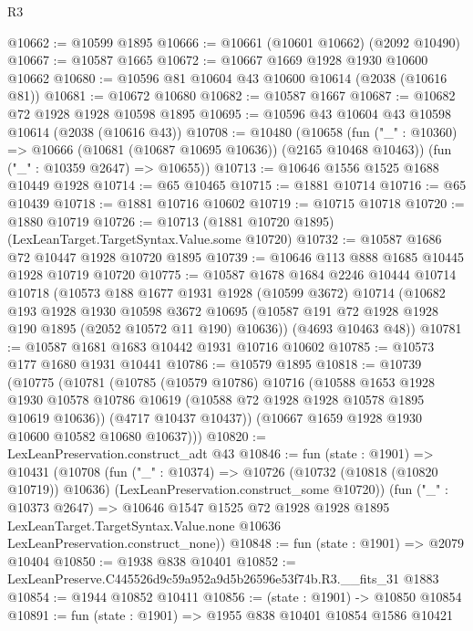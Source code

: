 \begin{lexlean}{R3}
\begin{coremodule}
@10662 := @10599 @1895
@10666 := @10661 (@10601 @10662) (@2092 @10490)
@10667 := @10587 @1665
@10672 := @10667 @1669 @1928 @1930 @10600 @10662
@10680 := @10596 @81 @10604 @43 @10600 @10614 (@2038 (@10616 @81))
@10681 := @10672 @10680
@10682 := @10587 @1667
@10687 := @10682 @72 @1928 @1928 @10598 @1895
@10695 := @10596 @43 @10604 @43 @10598 @10614 (@2038 (@10616 @43))
@10708 := @10480
    (@10658
      (fun ("_" : @10360) => @10666 (@10681 (@10687 @10695 @10636)) (@2165 @10468 @10463))
      (fun ("_" : @10359 @2647) => @10655))
@10713 := @10646 @1556 @1525 @1688 @10449 @1928
@10714 := @65 @10465
@10715 := @1881 @10714
@10716 := @65 @10439
@10718 := @1881 @10716 @10602
@10719 := @10715 @10718
@10720 := @1880 @10719
@10726 := @10713 (@1881 @10720 @1895) (LexLeanTarget.TargetSyntax.Value.some @10720)
@10732 := @10587 @1686 @72 @10447 @1928 @10720 @1895
@10739 := @10646 @113 @888 @1685 @10445 @1928 @10719 @10720
@10775 := @10587
    @1678
    @1684
    @2246
    @10444
    @10714
    @10718
    (@10573
      @188
      @1677
      @1931
      @1928
      (@10599 @3672)
      @10714
      (@10682
        @193
        @1928
        @1930
        @10598
        @3672
        @10695
        (@10587 @191 @72 @1928 @1928 @190 @1895 (@2052 @10572 @11 @190) @10636))
      (@4693 @10463 @48))
@10781 := @10587 @1681 @1683 @10442 @1931 @10716 @10602
@10785 := @10573 @177 @1680 @1931 @10441
@10786 := @10579 @1895
@10818 := @10739
    (@10775
      (@10781
        (@10785
          (@10579 @10786)
          @10716
          (@10588
            @1653
            @1928
            @1930
            @10578
            @10786
            @10619
            (@10588 @72 @1928 @1928 @10578 @1895 @10619 @10636))
          (@4717 @10437 @10437))
        (@10667 @1659 @1928 @1930 @10600 @10582 @10680 @10637)))
@10820 := LexLeanPreservation.construct_adt @43
@10846 := fun (state : @1901) =>
  @10431
    (@10708
      (fun ("_" : @10374) =>
      @10726 (@10732 (@10818 (@10820 @10719)) @10636) (LexLeanPreservation.construct_some @10720))
      (fun ("_" : @10373 @2647) =>
      @10646
        @1547
        @1525
        @72
        @1928
        @1928
        @1895
        LexLeanTarget.TargetSyntax.Value.none
        @10636
        LexLeanPreservation.construct_none))
@10848 := fun (state : @1901) => @2079 @10404
@10850 := @1938 @838 @10401
@10852 := LexLeanPreserve.C445526d9c59a952a9d5b26596e53f74b.R3.__fits_31 @1883
@10854 := @1944 @10852 @10411
@10856 := (state : @1901) -> @10850 @10854
@10891 := fun (state : @1901) =>
  @1955
    @838
    @10401
    @10854
    @1586
    @10421

\end{coremodule}
\end{lexlean}
